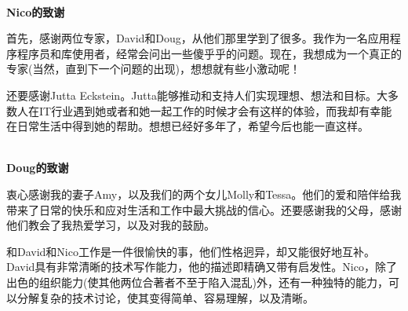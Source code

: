 \hspace*{\fill} \\ %
\noindent\textbf{Nico的致谢}

首先，感谢两位专家，David和Doug，从他们那里学到了很多。我作为一名应用程序程序员和库使用者，经常会问出一些傻乎乎的问题。现在，我想成为一个真正的专家(当然，直到下一个问题的出现)，想想就有些小激动呢！

还要感谢Jutta Eckstein。Jutta能够推动和支持人们实现理想、想法和目标。大多数人在IT行业遇到她或者和她一起工作的时候才会有这样的体验，而我却有幸能在日常生活中得到她的帮助。想想已经好多年了，希望今后也能一直这样。

\hspace*{\fill} \\ %
\noindent\textbf{Doug的致谢}

衷心感谢我的妻子Amy，以及我们的两个女儿Molly和Tessa。他们的爱和陪伴给我带来了日常的快乐和应对生活和工作中最大挑战的信心。还要感谢我的父母，感谢他们教会了我热爱学习，以及对我的鼓励。

和David和Nico工作是一件很愉快的事，他们性格迥异，却又能很好地互补。David具有非常清晰的技术写作能力，他的描述即精确又带有启发性。Nico，除了出色的组织能力(使其他两位合著者不至于陷入混乱)外，还有一种独特的能力，可以分解复杂的技术讨论，使其变得简单、容易理解，以及清晰。



